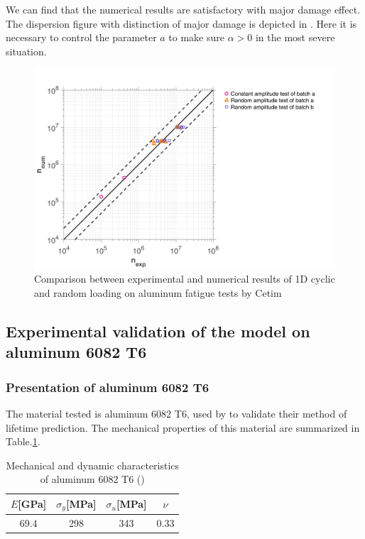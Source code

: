 We can find that the numerical results are satisfactory with major damage effect. The dispersion figure with distinction of major damage is depicted in . Here it is necessary to control the parameter $a$ to make sure $\alpha>0$ in the most severe situation.

\begin{figure}[!h]
\centering
\includegraphics[width=\textwidth]{figures//Cetim_err.png} 
\caption{Comparison between experimental and numerical results of 1D cyclic and random loading on aluminum fatigue tests by Cetim}
\label{fig.Cetimerr}
\end{figure}

\clearpage
\subsection{Experimental validation of the model on aluminum 6082 T6}
\subsubsection{Presentation of aluminum 6082 T6}

The material tested is aluminum 6082 T6, used by \cite{susmel2003multiaxial} to validate their method of lifetime prediction. The mechanical properties of this material are summarized in Table.\ref{tab.al6082t6}.

\begin{table}[!h]
\centering
\begin{tabular}{|c|c|c|c|}
\hline
\textbf{$E${[}GPa{]}} & \textbf{$\sigma_{y}${[}MPa{]}} & \textbf{$\sigma_u${[}MPa{]}} & \textbf{$\nu$} \\ \hline
69.4                                  & 298                                & 343                         & 0.33                 \\ \hline
\end{tabular}
\caption{Mechanical and dynamic characteristics of aluminum 6082 T6 (\cite{susmel2003multiaxial})}
\label{tab.al6082t6}
\end{table}
